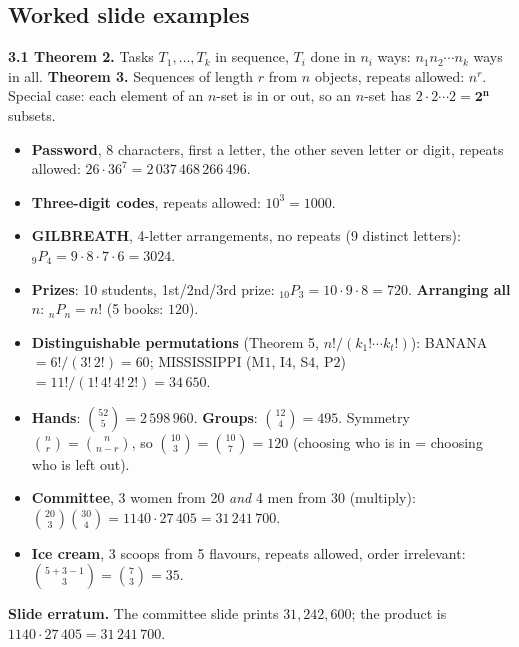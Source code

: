 \documentclass{fkt-notes}
\newcommand{\erratum}[1]{\par\noindent\textbf{Slide erratum.} #1\par}
\newcommand{\kolman}[1]{\setcounter{section}{\numexpr#1-1\relax}}
\theoremstyle{definition}
\begin{document}
\subsection{Worked slide examples}
%
\begin{rulepar}
  \textbf{3.1 Theorem 2.} Tasks $T_1,\dots,T_k$ in sequence, $T_i$ done in
  $n_i$ ways: $n_1n_2\cdots n_k$ ways in all.
  \textbf{Theorem 3.} Sequences of length $r$ from $n$ objects, repeats
  allowed: $n^r$. Special case: each element of an $n$-set is in or out, so
  an $n$-set has $2\cdot2\cdots2=\mathbf{2^n}$ subsets.
\end{rulepar}
\begin{itemize}[nosep]
  \item \textbf{Password}, 8 characters, first a letter, the other seven
        letter or digit, repeats allowed:
        $26\cdot36^7=2\,037\,468\,266\,496$.
  \item \textbf{Three-digit codes}, repeats allowed: $10^3=1000$.
  \item \textbf{GILBREATH}, 4-letter arrangements, no repeats (9 distinct
        letters): ${}_9P_4=9\cdot8\cdot7\cdot6=3024$.
  \item \textbf{Prizes}: 10 students, 1st/2nd/3rd prize:
        ${}_{10}P_3=10\cdot9\cdot8=720$. \textbf{Arranging all} $n$:
        ${}_nP_n=n!$ (5 books: $120$).
  \item \textbf{Distinguishable permutations} (Theorem 5,
        $n!/(k_1!\cdots k_t!)$): BANANA $=6!/(3!\,2!)=60$;
        MISSISSIPPI (M$1$, I$4$, S$4$, P$2$) $=11!/(1!\,4!\,4!\,2!)=34\,650$.
  \item \textbf{Hands}: $\binom{52}{5}=2\,598\,960$. \textbf{Groups}:
        $\binom{12}{4}=495$. Symmetry $\binom nr=\binom n{n-r}$, so
        $\binom{10}3=\binom{10}7=120$ (choosing who is in = choosing who is
        left out).
  \item \textbf{Committee}, 3 women from 20 \emph{and} 4 men from 30
        (multiply): $\binom{20}3\binom{30}4=1140\cdot27\,405=31\,241\,700$.
  \item \textbf{Ice cream}, 3 scoops from 5 flavours, repeats allowed,
        order irrelevant: $\binom{5+3-1}{3}=\binom73=35$.
\end{itemize}
\erratum{The committee slide prints $31{,}242{,}600$; the product is
  $1140\cdot27\,405=31\,241\,700$.}

\kolman{3}
\end{document}
